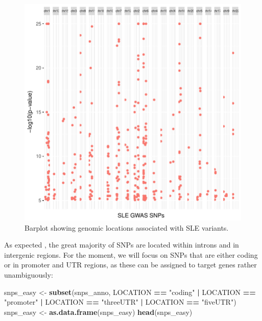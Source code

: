 \documentclass[9pt,a4paper,]{extarticle}
\newenvironment{Shaded}{\begin{snugshade}}{\end{snugshade}}
\newcommand{\KeywordTok}[1]{\textcolor[rgb]{0.13,0.29,0.53}{\textbf{#1}}}
\newcommand{\StringTok}[1]{\textcolor[rgb]{0.31,0.60,0.02}{#1}}
\newcommand{\OperatorTok}[1]{\textcolor[rgb]{0.81,0.36,0.00}{\textbf{#1}}}
\newcommand{\NormalTok}[1]{#1}
\begin{document}
\begin{figure}

{\centering \includegraphics{biocondutor-regulatory-genomics-workflow_files/figure-latex/figure5-1} 

}

\caption{Barplot showing genomic locations associated with SLE variants.}\label{fig:figure5}
\end{figure}

As expected \citep{Maurano2012}, the great majority of SNPs are located within introns and in intergenic regions.
For the moment, we will focus on SNPs that are either coding or in promoter and UTR regions, as these can be assigned to target genes rather unambiguously:

\begin{Shaded}
\begin{Highlighting}[]
\NormalTok{snps_easy <-}\StringTok{ }\KeywordTok{subset}\NormalTok{(snps_anno, LOCATION }\OperatorTok{==}\StringTok{ "coding"} \OperatorTok{|}\StringTok{ }\NormalTok{LOCATION }\OperatorTok{==}\StringTok{ "promoter"} \OperatorTok{|}\StringTok{ }\NormalTok{LOCATION }\OperatorTok{==}\StringTok{ "threeUTR"} \OperatorTok{|}\StringTok{ }\NormalTok{LOCATION }\OperatorTok{==}\StringTok{ "fiveUTR"}\NormalTok{)}
\NormalTok{snps_easy <-}\StringTok{ }\KeywordTok{as.data.frame}\NormalTok{(snps_easy)}
\KeywordTok{head}\NormalTok{(snps_easy)}
\end{Highlighting}
\end{Shaded}
\end{document}
